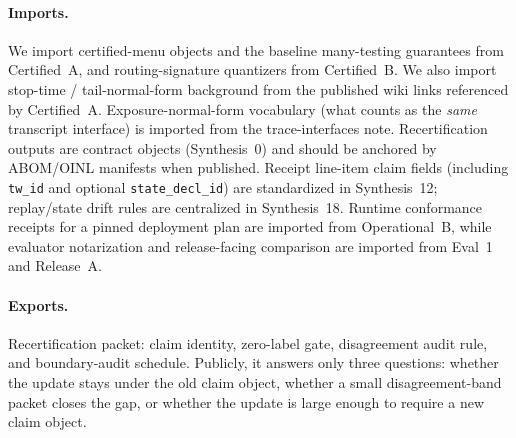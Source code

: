\documentclass[11pt]{article}
\begin{document}
\paragraph{Imports.}
We import certified-menu objects and the baseline many-testing guarantees from Certified~A, and routing-signature quantizers from Certified~B.\cite{series:menus,series:sigcomp}
We also import stop-time / tail-normal-form background from the published wiki links referenced by Certified~A.
Exposure-normal-form vocabulary (what counts as the \emph{same} transcript interface) is imported from the trace-interfaces note.\cite{series:traceifaces}
Recertification outputs are contract objects (Synthesis~0) and should be anchored by ABOM/OINL manifests when published.\cite{series:contractobjects,series:abomoinl}
Receipt line-item claim fields (including \texttt{tw\_id} and optional \texttt{state\_decl\_id}) are standardized in Synthesis~12; replay/state drift rules are centralized in Synthesis~18.\cite{series:receiptitems,series:planstateequiv}
Runtime conformance receipts for a pinned deployment plan are imported from Operational~B, while evaluator notarization and release-facing comparison are imported from Eval~1 and Release~A.\cite{series:operationalB,series:eval1,series:releaseA}

\paragraph{Exports.}
Recertification packet: claim identity, zero-label gate, disagreement audit rule, and boundary-audit schedule. Publicly, it answers only three questions: whether the update stays under the old claim object, whether a small disagreement-band packet closes the gap, or whether the update is large enough to require a new claim object.
\end{document}
